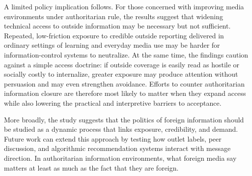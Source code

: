 \documentclass[12pt,american]{article}
\begin{document}
	A limited policy implication follows. For those concerned with improving media environments under authoritarian rule, the results suggest that widening technical access to outside information may be necessary but not sufficient. Repeated, low-friction exposure to credible outside reporting delivered in ordinary settings of learning and everyday media use may be harder for information-control systems to neutralize. At the same time, the findings caution against a simple access doctrine: if outside coverage is easily read as hostile or socially costly to internalize, greater exposure may produce attention without persuasion and may even strengthen avoidance. Efforts to counter authoritarian information closure are therefore most likely to matter when they expand access while also lowering the practical and interpretive barriers to acceptance.

	More broadly, the study suggests that the politics of foreign information should be studied as a dynamic process that links exposure, credibility, and demand. Future work can extend this approach by testing how outlet labels, peer discussion, and algorithmic recommendation systems interact with message direction. In authoritarian information environments, what foreign media say matters at least as much as the fact that they are foreign.
	
	\clearpage
	\begingroup
	\singlespacing
	\setlength\bibitemsep{0pt}
	\printbibliography
	\endgroup
	
\end{document}
